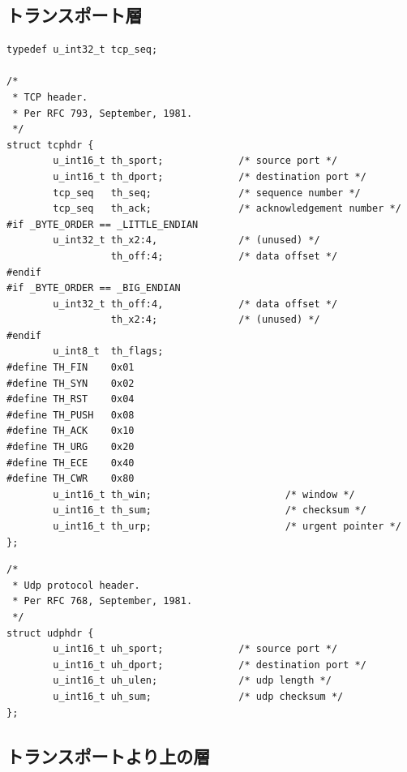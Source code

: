 \subsection{トランスポート層} \label{sec:transport}

\begin{lstlisting}[caption=TCPヘッダ定義 (/usr/include/netinet/tcp.h),label=src:tcp.h]
typedef u_int32_t tcp_seq;

/*
 * TCP header.
 * Per RFC 793, September, 1981.
 */
struct tcphdr {
        u_int16_t th_sport;             /* source port */
        u_int16_t th_dport;             /* destination port */
        tcp_seq   th_seq;               /* sequence number */
        tcp_seq   th_ack;               /* acknowledgement number */
#if _BYTE_ORDER == _LITTLE_ENDIAN
        u_int32_t th_x2:4,              /* (unused) */
                  th_off:4;             /* data offset */
#endif
#if _BYTE_ORDER == _BIG_ENDIAN
        u_int32_t th_off:4,             /* data offset */
                  th_x2:4;              /* (unused) */
#endif
        u_int8_t  th_flags;
#define TH_FIN    0x01
#define TH_SYN    0x02
#define TH_RST    0x04
#define TH_PUSH   0x08
#define TH_ACK    0x10
#define TH_URG    0x20
#define TH_ECE    0x40
#define TH_CWR    0x80
        u_int16_t th_win;                       /* window */
        u_int16_t th_sum;                       /* checksum */
        u_int16_t th_urp;                       /* urgent pointer */
};
\end{lstlisting}

\begin{lstlisting}[caption=UDPヘッダ定義 (/usr/include/netinet/udp.h),label=src:udp.h]
/*
 * Udp protocol header.
 * Per RFC 768, September, 1981.
 */
struct udphdr {
        u_int16_t uh_sport;             /* source port */
        u_int16_t uh_dport;             /* destination port */
        u_int16_t uh_ulen;              /* udp length */
        u_int16_t uh_sum;               /* udp checksum */
};
\end{lstlisting}

\subsection{トランスポートより上の層}